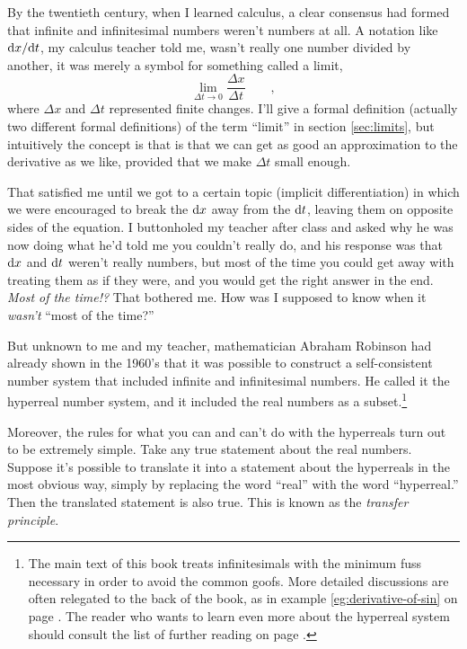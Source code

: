 By the twentieth century, when I learned calculus, a clear consensus had formed that infinite and infinitesimal
numbers weren't numbers at all. A notation like $\textup{d} x/\textup{d} t$, my calculus teacher told me, wasn't really
one number divided by another, it was merely a symbol for something called a limit,
\begin{equation*}
\lim_{\Delta t\rightarrow 0} \frac{\Delta x}{\Delta t} \qquad ,
\end{equation*}
where $\Delta x$ and $\Delta t$ represented finite changes. I'll give a formal definition (actually two different formal
definitions) of the term ``limit'' in section \ref{sec:limits}, but intuitively the concept is that is that we can get as good
an approximation to the derivative as we like, provided that we make $\Delta t$ small enough.

That satisfied me until we got to a certain topic
(implicit differentiation) in which we were encouraged to break the $\textup{d} x$ away from the $\textup{d} t$, leaving them on
opposite sides of the equation. I buttonholed my teacher after class and asked why he was now doing what he'd
told me you couldn't really do, and his response was that $\textup{d} x$ and $\textup{d} t$ weren't really numbers,
but most of the time you could get away with treating them as if they were, and you would get the right
answer in the end. \emph{Most of the time!?} That bothered me. How was I supposed to know when it \emph{wasn't}
``most of the time?''


But unknown to me and my teacher, mathematician Abraham Robinson
had already shown in the 1960's that it
was possible to construct a self-consistent number system that included infinite and infinitesimal numbers.
He called it the hyperreal number system,
and it included the real numbers as a subset.\footnote{The main text of this book treats infinitesimals
with the minimum fuss necessary in order to avoid the common goofs. More detailed
discussions are often relegated to the back of the book, as in example \ref{eg:derivative-of-sin} on page \pageref{eg:derivative-of-sin}.
The reader who
wants to learn even more about the hyperreal system should consult the list of further reading on page \pageref{ch:further-reading}.
}

Moreover, the
rules for what you can and can't do with the hyperreals turn out to be extremely simple. 
Take any true statement about the real numbers. Suppose it's possible to translate it into a statement about
the hyperreals in the most obvious way, simply by replacing the word ``real'' with the word ``hyperreal.''
Then the translated statement is also true. This is known as the \emph{transfer principle}.


